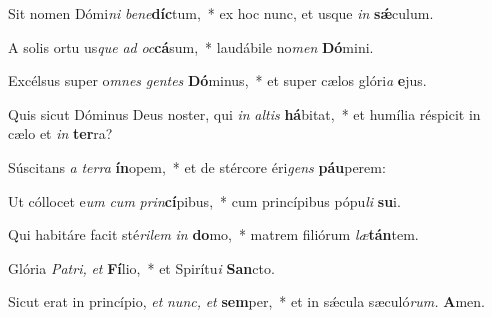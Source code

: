 \item Sit nomen Dómi\textit{ni} \textit{be}\textit{ne}\textbf{díc}tum,~* ex hoc nunc, et usque \textit{in} \textbf{sǽ}culum.
\item A solis ortu us\hspace*{0.03em}\textit{que} \textit{ad} \textit{oc}\textbf{cá}sum,~* laudábile no\textit{men} \textbf{Dó}mini.
\item Excélsus super o\textit{mnes} \textit{gen}\textit{tes} \textbf{Dó}minus,~* et super cælos glóri\hspace*{0.03em}\textit{a} \textbf{e}jus.
\item Quis sicut Dóminus Deus noster, qui \textit{in} \textit{al}\textit{tis} \textbf{há}bitat,~* et humília réspicit in cælo et \textit{in} \textbf{ter}ra?
\item Súscitans \textit{a} \textit{ter}\textit{ra} \textbf{ín}opem,~* et de stércore éri\textit{gens} \textbf{páu}perem:
\item Ut cóllocet e\hspace*{0.03em}\textit{um} \textit{cum} \textit{prin}\textbf{cí}pibus,~* cum princípibus pópu\textit{li} \textbf{su}i.
\item Qui habitáre facit sté\hspace*{0.03em}\textit{ri}\textit{lem} \textit{in} \textbf{do}mo,~* matrem filiórum \textit{læ}\textbf{tán}tem.
\item Glória \textit{Patri,} \textit{et} \textbf{Fí}lio,~* et Spirítu\hspace{0.03em}\textit{i} \textbf{San}cto.
\item Sicut erat in princípio, \textit{et} \textit{nunc,} \textit{et} \textbf{sem}per,~* et in sǽcula sæculó\textit{rum.} \textbf{A}men.